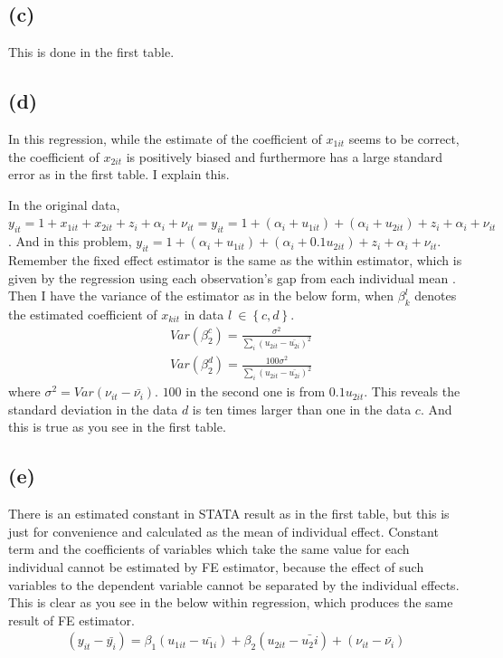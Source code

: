 \documentclass{article}
\begin{document}
\subsection{(c)}
This is done in the first table.

\subsection{(d)}
In this regression, while the estimate of the coefficient of $x_{1it}$ seems to be correct, the coefficient of $x_{2it}$ is positively biased and furthermore has a large standard error as in the first table. I explain this.

In the original data, $y_{it} = 1 + x_{1it} + x_{2it} + z_i + \alpha_i + \nu_{it} = y_{it} = 1 + \left( \alpha_i + u_{1it} \right) + \left( \alpha_i + u_{2it} \right) + z_i + \alpha_i + \nu_{it}$. And in this problem, $y_{it} = 1 + \left( \alpha_i + u_{1it} \right) + \left( \alpha_i + 0.1 u_{2it} \right) + z_i + \alpha_i + \nu_{it}$. Remember the fixed effect estimator is the same as the within estimator, which is given by the regression using each observation's gap from each individual mean . Then I have the variance of the estimator as in the below form, when $\beta_k^l$ denotes the estimated coefficient of $x_{kit}$ in data $l\ \in \left\{ c, d\right\}$.
\begin{align*}
	&Var\left( \beta_2^c \right) = \frac{\sigma^2}{\sum_i (u_{2it} - \bar{u_{2i}})^2}\\
	&Var\left( \beta_2^d \right) = \frac{100\sigma^2}{\sum_i (u_{2it} - \bar{u_{2i}})^2}
\end{align*}
where $\sigma^2 = Var(\nu_{it} - \bar{\nu_i})$. $100$ in the second one is from $0.1 u_{2it}$. This reveals the standard deviation in the data $d$ is ten times larger than one in the data $c$. And this is true as you see in the first table.

\subsection{(e)}
There is an estimated constant in STATA result as in the first table, but this is just for convenience and calculated as the mean of individual effect. Constant term and the coefficients of variables which take the same value for each individual cannot be estimated by FE estimator, because the effect of such variables to the dependent variable cannot be separated by the individual effects. This is clear as you see in the below within regression, which produces the same result of FE estimator.
\begin{align*}
	(y_{it} - \bar{y_i}) = \beta_1 (u_{1it} - \bar{u_{1i}}) + \beta_2 (u_{2it} - \bar{u_2i}) + (\nu_{it} - \bar{\nu_i})
\end{align*}
\end{document}
